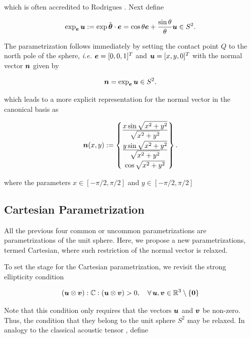 \documentclass[12pt]{article}
\numberwithin{equation}{section}
\begin{document}
which is often accredited to Rodrigues
\citep{Gallier:2011}. Next define

\begin{equation}
  \exp_{{\boldsymbol{e}}} {\boldsymbol{u}}
  :=
  \exp \check{{\boldsymbol{\theta}}} \cdot {\boldsymbol{e}}
  =
  \cos \theta {\boldsymbol{e}} + \frac{\sin \theta}{\theta}
  {\boldsymbol{u}} \in S^2.
\end{equation}

The parametrization follows immediately by setting the contact point
$Q$ to the north pole of the sphere, \emph{i.e.} ${\boldsymbol{e}} = [0,0,1]^T$ and
${\boldsymbol{u}} = [x,y,0]^T$ with the normal vector ${\boldsymbol{n}}$ given by

\begin{equation}
  {\boldsymbol{n}}
  =
  \exp_{{\boldsymbol{e}}} {\boldsymbol{u}} \in S^2.
\end{equation}

which leads to a more explicit representation for the normal vector in
the canonical basis as

\begin{equation}
  {\boldsymbol{n}}(x,y)
  := 
  \begin{Bmatrix}
    \frac{\displaystyle x \sin \sqrt{x^2+y^2}}{\displaystyle \sqrt{x^2+y^2}}
    \\[0.9em]
    \frac{\displaystyle y \sin \sqrt{x^2+y^2}}{\displaystyle \sqrt{x^2+y^2}}
    \\[0.9em]
    \cos \sqrt{x^2+y^2}
  \end{Bmatrix}.
\end{equation}

where the parameters $x \in [-\pi / 2, \pi / 2]$ and
$y \in [-\pi / 2, \pi / 2]$

\subsection{Cartesian Parametrization}
\label{subsec:Cartesian}

All the previous four common or uncommon parametrizations are 
parametrizations of the unit sphere. Here, we propose a new 
parametrizations, termed Cartesian, where such restriction of the 
normal vector is relaxed.

To set the stage for the Cartesian parametrization, we revisit the 
strong ellipticity condition

\begin{equation}
  ({\boldsymbol{u}} \otimes {\boldsymbol{v}}) : \mathbb{C} : ({\boldsymbol{u}} \otimes {\boldsymbol{v}}) > 0,
  \quad
  \forall \, {\boldsymbol{u}}, {\boldsymbol{v}} \in \mathbb{R}^3 \setminus \{\mathbf{0}\}
\end{equation}

Note that this condition only requires that the vectors ${\boldsymbol{u}}$ and ${\boldsymbol{v}}
$ be non-zero. Thus, the condition that they belong to the unit sphere 
$S^2$ may be relaxed. In analogy to the classical acoustic tensor 
, define
\end{document}
